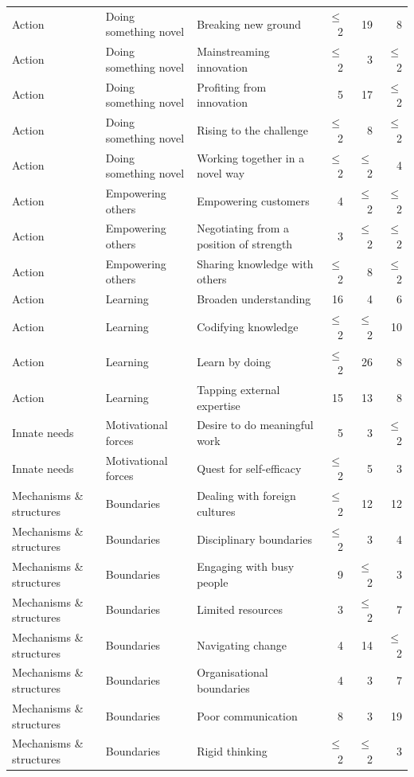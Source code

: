 \begin{landscape}
\begin{longtable}[c]{lllrrr}
Action & Doing something novel & Breaking new ground & $\leq$ 2 & 19 & 8 \\ 
Action & Doing something novel & Mainstreaming innovation & $\leq$ 2 & 3 & $\leq$ 2 \\ 
Action & Doing something novel & Profiting from innovation & 5 & 17 & $\leq$ 2 \\ 
Action & Doing something novel & Rising to the challenge & $\leq$ 2 & 8 & $\leq$ 2 \\ 
Action & Doing something novel & Working together in a novel way & $\leq$ 2 & $\leq$ 2 & 4 \\ 
Action & Empowering others & Empowering customers & 4 & $\leq$ 2 & $\leq$ 2 \\ 
Action & Empowering others & Negotiating from a position of strength & 3 & $\leq$ 2 & $\leq$ 2 \\ 
Action & Empowering others & Sharing knowledge with others & $\leq$ 2 & 8 & $\leq$ 2 \\ 
Action & Learning & Broaden understanding & 16 & 4 & 6 \\ 
Action & Learning & Codifying knowledge & $\leq$ 2 & $\leq$ 2 & 10 \\ 
Action & Learning & Learn by doing & $\leq$ 2 & 26 & 8 \\ 
Action & Learning & Tapping external expertise & 15 & 13 & 8 \\ 
Innate needs & Motivational forces & Desire to do meaningful work & 5 & 3 & $\leq$ 2 \\ 
Innate needs & Motivational forces & Quest for self-efficacy & $\leq$ 2 & 5 & 3 \\ 
Mechanisms \& structures & Boundaries & Dealing with foreign cultures & $\leq$ 2 & 12 & 12 \\ 
Mechanisms \& structures & Boundaries & Disciplinary boundaries & $\leq$ 2 & 3 & 4 \\ 
Mechanisms \& structures & Boundaries & Engaging with busy people & 9 & $\leq$ 2 & 3 \\ 
Mechanisms \& structures & Boundaries & Limited resources & 3 & $\leq$ 2 & 7 \\ 
Mechanisms \& structures & Boundaries & Navigating change & 4 & 14 & $\leq$ 2 \\ 
Mechanisms \& structures & Boundaries & Organisational boundaries & 4 & 3 & 7 \\ 
Mechanisms \& structures & Boundaries & Poor communication & 8 & 3 & 19 \\ 
Mechanisms \& structures & Boundaries & Rigid thinking & $\leq$ 2 & $\leq$ 2 & 3 \\ 

\end{longtable}
\end{landscape}
